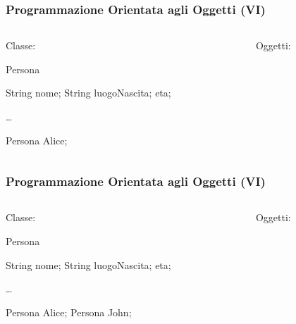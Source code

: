 \begin{frame}[fragile]\frametitle{Programmazione Orientata agli Oggetti (VI)}


  \begin{columns}[T]
    \begin{column}[T]{7cm}
    Classe:
    \begin{JavaCodePlain}[commandchars=\\!|]
    
    \Jpublic \Jclass Persona {

      \Jprivate String nome;      
      \Jprivate String luogoNascita;
      \Jprivate \Jint eta;

    }
    
    \dots
    
    Persona Alice;

    \end{JavaCodePlain}
    \end{column}

    \begin{column}[T]{5cm}
    Oggetti:
    \begin{center}
    \end{center}
    \end{column}
  \end{columns}

\end{frame}

\begin{frame}[fragile]\frametitle{Programmazione Orientata agli Oggetti (VI)}


  \begin{columns}[T]
    \begin{column}[T]{7cm}
    Classe:
    \begin{JavaCodePlain}[commandchars=\\!|]
    
    \Jpublic \Jclass Persona {

      \Jprivate String nome;      
      \Jprivate String luogoNascita;
      \Jprivate \Jint eta;

    }

    \dots
    
    Persona Alice;
    Persona John;

    \end{JavaCodePlain}
    \end{column}

    \begin{column}[T]{5cm}
    Oggetti:
    \begin{center}
    \end{center}
    \end{column}
  \end{columns}
  
\end{frame}

